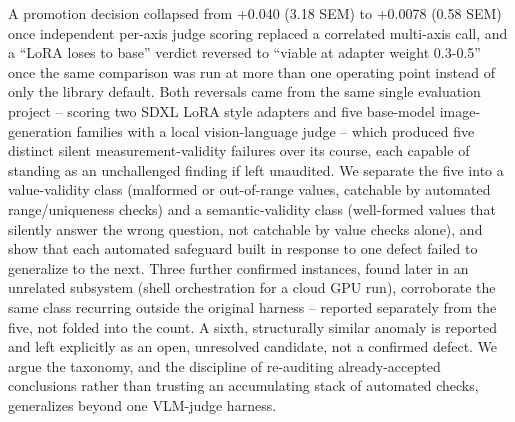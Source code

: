 A promotion decision collapsed from +0.040 (3.18 SEM) to +0.0078 (0.58
SEM) once independent per-axis judge scoring replaced a correlated
multi-axis call, and a ``LoRA loses to base'' verdict reversed to
``viable at adapter weight 0.3-0.5'' once the same comparison was run at
more than one operating point instead of only the library default. Both
reversals came from the same single evaluation project -- scoring two
SDXL LoRA style adapters and five base-model image-generation families
with a local vision-language judge -- which produced five distinct
silent measurement-validity failures over its course, each capable of
standing as an unchallenged finding if left unaudited. We separate the
five into a value-validity class (malformed or out-of-range values,
catchable by automated range/uniqueness checks) and a semantic-validity
class (well-formed values that silently answer the wrong question, not
catchable by value checks alone), and show that each automated safeguard
built in response to one defect failed to generalize to the next. Three
further confirmed instances, found later in an unrelated subsystem
(shell orchestration for a cloud GPU run), corroborate the same class
recurring outside the original harness -- reported separately from the
five, not folded into the count. A sixth, structurally similar anomaly
is reported and left explicitly as an open, unresolved candidate, not a
confirmed defect. We argue the taxonomy, and the discipline of
re-auditing already-accepted conclusions rather than trusting an
accumulating stack of automated checks, generalizes beyond one VLM-judge
harness.
